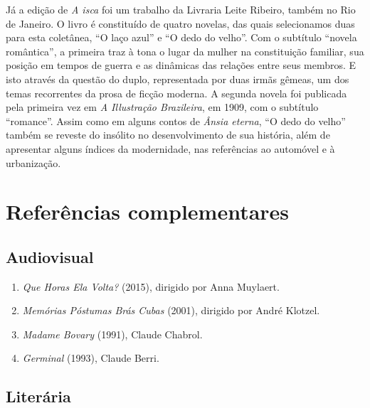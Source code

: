 \documentclass[12pt]{extarticle}
\begin{document}
Já a edição de \emph{A isca} foi um trabalho da Livraria Leite Ribeiro,
também no Rio de Janeiro. O livro é constituído de quatro novelas, das
quais selecionamos duas para esta coletânea, ``O laço azul'' e ``O dedo
do velho''. Com o subtítulo ``novela romântica'', a primeira traz à tona
o lugar da mulher na constituição familiar, sua posição em tempos de
guerra e as dinâmicas das relações entre seus membros. E isto através da
questão do duplo, representada por duas irmãs gêmeas, um dos temas
recorrentes da prosa de ficção moderna. A segunda novela foi publicada
pela primeira vez em \emph{A Illustração Brazileira}, em 1909, com o
subtítulo ``romance''. Assim como em alguns contos de \emph{Ânsia
eterna}, ``O dedo do velho'' também se reveste do insólito no
desenvolvimento de sua história, além de apresentar alguns índices da
modernidade, nas referências ao automóvel e à urbanização.

\section{Referências complementares}

\subsection{Audiovisual}

\begin{enumerate}
\item
  \emph{Que Horas Ela Volta?} (2015), dirigido por Anna Muylaert.
\item
  \emph{Memórias Póstumas Brás Cubas} (2001), dirigido por André
  Klotzel.
\item
  \emph{Madame Bovary} (1991), Claude Chabrol.
\item
  \emph{Germinal} (1993), Claude Berri.
\end{enumerate}

\subsection{Literária}
\end{document}
